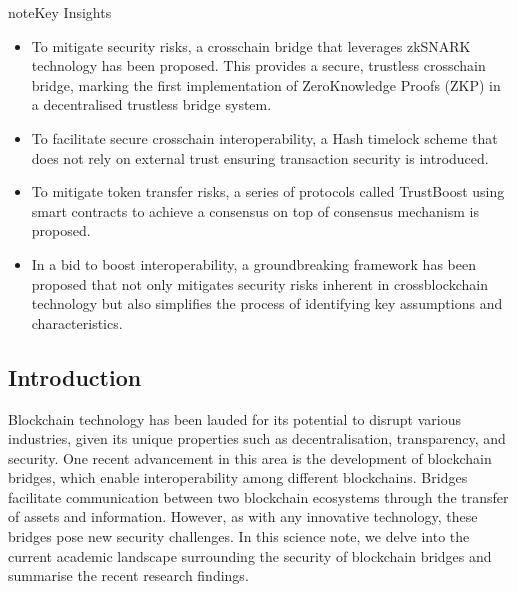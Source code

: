 \documentclass[letterpaper,10pt,english]{jupyterBook}
\begin{document}
\begin{sphinxadmonition}{note}{Key Insights}
\begin{itemize}
\item {} 
\sphinxAtStartPar
To mitigate security risks, a cross\sphinxhyphen{}chain bridge that leverages zk\sphinxhyphen{}SNARK technology has been proposed. This provides a secure, trustless cross\sphinxhyphen{}chain bridge, marking the first implementation of Zero\sphinxhyphen{}Knowledge Proofs (ZKP) in a decentralised trustless bridge system.

\item {} 
\sphinxAtStartPar
To facilitate secure cross\sphinxhyphen{}chain interoperability, a Hash time\sphinxhyphen{}lock scheme that does not rely on external trust ensuring transaction security is introduced.

\item {} 
\sphinxAtStartPar
To mitigate token transfer risks, a series of protocols called TrustBoost using smart contracts to achieve a consensus on top of consensus mechanism is proposed.

\item {} 
\sphinxAtStartPar
In a bid to boost interoperability, a groundbreaking framework has been proposed that not only mitigates security risks inherent in cross\sphinxhyphen{}blockchain technology but also simplifies the process of identifying key assumptions and characteristics.

\end{itemize}
\end{sphinxadmonition}


\subsection{Introduction}
\label{\detokenize{BBSecurity/bbsecurity:introduction}}
\sphinxAtStartPar
Blockchain technology has been lauded for its potential to disrupt various industries, given its unique properties such as decentralisation, transparency, and security. One recent advancement in this area is the development of blockchain bridges, which enable interoperability among different blockchains. Bridges facilitate communication between two blockchain ecosystems through the transfer of assets and information. However, as with any innovative technology, these bridges pose new security challenges. In this science note, we delve into the current academic landscape surrounding the security of blockchain bridges and summarise the recent research findings.
\end{document}
